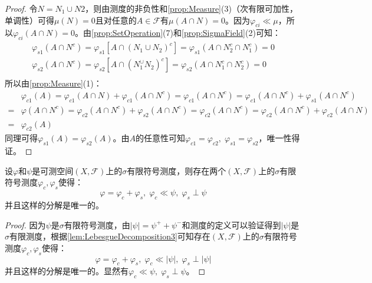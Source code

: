 \begin{proof}
	令$N=N_1\cup N2$，则由测度的非负性和\cref{prop:Measure}(3)（次有限可加性，单调性）可得$\mu(N)=0$且对任意的$A\in\mathscr{F}$有$\mu(A\cap N)=0$。因为$\varphi_{ci}\ll\mu$，所以$\varphi_{ci}(A\cap N)=0$。由\cref{prop:SetOperation}(7)和\cref{prop:SigmaField}(2)可知：
	\begin{gather*}
		\varphi_{s1}(A\cap N^c)=\varphi_{s1}[A\cap(N_1\cup N_2)^c]=\varphi_{s1}(A\cap N_2^c\cap N_1^c)=0 \\
		\varphi_{s2}(A\cap N^c)=\varphi_{s2}[A\cap(N_1^\cup N_2)^c]=\varphi_{s2}(A\cap N_1^c\cap N_2^c)=0 \\
	\end{gather*}
	所以由\cref{prop:Measure}(1)：
	\begin{align*}
		&\varphi_{c1}(A)=\varphi_{c1}(A\cap N)+\varphi_{c1}(A\cap N^c)=\varphi_{c1}(A\cap N^c)=\varphi_{c1}(A\cap N^c)+\varphi_{s1}(A\cap N^c) \\
		=&\varphi(A\cap N^c)=\varphi_{c2}(A\cap N^c)+\varphi_{s2}(A\cap N^c)=\varphi_{c2}(A\cap N^c)=\varphi_{c2}(A\cap N^c)+\varphi_{c2}(A\cap N) \\
		=&\varphi_{c2}(A)
	\end{align*}
	同理可得$\varphi_{s1}(A)=\varphi_{s2}(A)$。由$A$的任意性可知$\varphi_{c1}=\varphi_{c2},\;\varphi_{s1}=\varphi_{s2}$，唯一性得证。
\end{proof}
\begin{theorem}
	\label{theo:LebesgueDecomposition}
	设$\varphi$和$\psi$是可测空间$(X,\mathscr{F})$上的$\sigma$有限符号测度，则存在两个$(X,\mathscr{F})$上的$\sigma$有限符号测度$\varphi_c,\varphi_s$使得：
	\begin{equation*}
		\varphi=\varphi_c+\varphi_s,\;\varphi_c\ll\psi,\;\varphi_s\perp\psi
	\end{equation*}
	并且这样的分解是唯一的。
\end{theorem}
\begin{proof}
	因为$\psi$是$\sigma$有限符号测度，由$|\psi|=\psi^++\psi^-$和测度的定义可以验证得到$|\psi|$是$\sigma$有限测度，根据\cref{lem:LebesgueDecomposition3}可知存在$(X,\mathscr{F})$上的$\sigma$有限符号测度$\varphi_c,\varphi_s$使得：
	\begin{equation*}
		\varphi=\varphi_c+\varphi_s,\;\varphi_c\ll|\psi|,\;\varphi_s\perp|\psi|
	\end{equation*}
	并且这样的分解是唯一的。显然有$\varphi_c\ll\psi,\;\varphi_s\perp\psi$。
\end{proof}